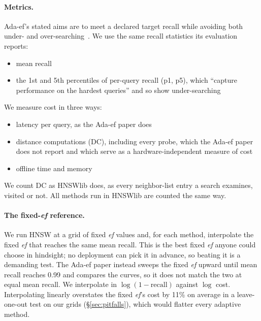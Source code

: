 \documentclass[sigconf, nonacm]{acmart}
\newcommand{\ef}{\textit{ef}}
\begin{document}
\paragraph{Metrics.}
Ada-ef's stated aims are to meet a declared target recall while avoiding both under- and
over-searching~\cite{zhang2026adaef}. We use the same recall statistics its evaluation reports:
\begin{itemize}
\item mean recall
\item the 1st and 5th percentiles of per-query recall (p1, p5), which ``capture performance on the
  hardest queries'' and so show under-searching~\cite[\S 7.2]{zhang2026adaef}
\end{itemize}
We measure cost in three ways:
\begin{itemize}
\item latency per query, as the Ada-ef paper does
\item distance computations (DC), including every probe, which the Ada-ef paper does not report and
  which serve as a hardware-independent measure of cost
\item offline time and memory
\end{itemize}
We count DC as HNSWlib does, as every neighbor-list entry a search examines, visited or not. All
methods run in HNSWlib are counted the same way.

\paragraph{The fixed-\ef{} reference.}
We run HNSW at a grid of fixed \ef{} values and, for each method, interpolate the fixed \ef{} that
reaches the same mean recall. This is the best fixed \ef{} anyone could choose in hindsight; no
deployment can pick it in advance, so beating it is a demanding test. The Ada-ef paper instead sweeps
the fixed \ef{} upward until mean recall reaches 0.99 and compares the curves, so it does not match
the two at equal mean recall. We interpolate in $\log(1 - \text{recall})$ against $\log$ cost.
Interpolating linearly overstates the fixed \ef{}'s cost by 11\% on average in a leave-one-out test
on our grids (\S\ref{sec:pitfalls}), which would flatter every adaptive method.

\begin{table}[t]
  \caption{Datasets, sorted by KS (200 queries). $\rho$: rank correlation between each score and
  the true per-query $\mathrm{ef}^*$ on the calibration set, settings P / R; the larger magnitude
  ranks queries better. A dash: the score is constant on the calibration queries.}
  \label{tab:datasets}
  \centering\footnotesize
  \resizebox{\linewidth}{!}{}
\end{table}
\end{document}
